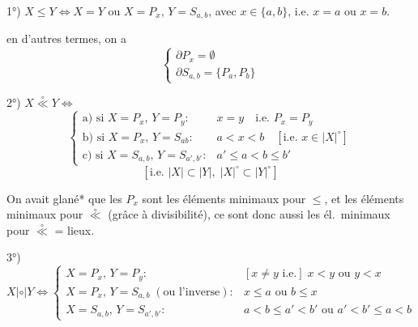 \documentclass[11pt,a4paper]{article}
\begin{document}
1°) $X\le Y \Longleftrightarrow X = Y$ ou $X = P_x$, $Y = S_{a,b}$, avec $x\in\{a,b\}$, i.e. $x = a$ ou $x = b$.

 en d'autres termes, on a
\[
\begin{cases}
\partial P_x = \emptyset\\
\partial S_{a,b} = \{P_a, P_b\}
\end{cases}
\]

2°) $X \overset{\circ}{\ll} Y \Longleftrightarrow$ 
\[
\begin{cases}
\text{a) si } X = P_x,\, Y = P_y : & x = y \quad \text{i.e. } P_x = P_y\\
\text{b) si } X = P_x,\, Y = S_{ab} : & a<x<b \quad [\text{i.e. } x\in|X|^\circ]\\
\text{c) si } X = S_{a,b},\, Y = S_{a',b'} : & a'\le a<b\le b'
\end{cases}
\]
\[
[\text{i.e. } |X|\subset|Y|,\; |X|^\circ\subset|Y|^\circ]
\]

On avait glané* que les $P_x$ sont les éléments minimaux pour $\le$, et les éléments minimaux pour $\overset{\circ}{\ll}$ (grâce à divisibilité), ce sont donc aussi les él.\ minimaux pour $\overset{\circ}{\ll}$ = lieux.


3°)
\[
X \mathrel{|{\circ}|} Y \Longleftrightarrow
\begin{cases}
X = P_x,\, Y = P_y : & [x\neq y \text{ i.e.}]\; x<y \text{ ou } y<x\\
X = P_x,\, Y = S_{a,b}\;(\text{ou l'inverse}) : & x\le a \text{ ou } b \le x\\
X = S_{a,b},\, Y = S_{a',b'} : & a<b\le a'<b' \text{ ou } a'<b'\le a<b
\end{cases}
\]
\end{document}
